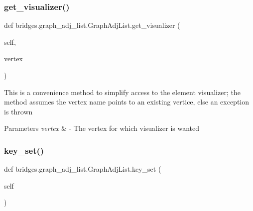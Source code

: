 \mbox{\label{classbridges_1_1graph__adj__list_1_1_graph_adj_list_ad63fce416ec0fdfd99d05e6236807fd8}} 
\subsubsection{\texorpdfstring{get\_visualizer()}{get\_visualizer()}}
{\footnotesize\ttfamily def bridges.\+graph\+\_\+adj\+\_\+list.\+Graph\+Adj\+List.\+get\+\_\+visualizer (\begin{DoxyParamCaption}\item[{}]{self,  }\item[{}]{vertex }\end{DoxyParamCaption})}

\begin{DoxyVerb}This is a convenience method to simplify access to the element visualizer;
the method assumes the vertex name points to an existing vertice, else an
exception is thrown
\end{DoxyVerb}



\begin{DoxyParams}{Parameters}
{\em vertex} & -\/ The vertex for which visualizer is wanted \\
\hline
\end{DoxyParams}
\mbox{\label{classbridges_1_1graph__adj__list_1_1_graph_adj_list_a96e264e71acad7474e233a1ec1d1035a}} 
\subsubsection{\texorpdfstring{key\_set()}{key\_set()}}
{\footnotesize\ttfamily def bridges.\+graph\+\_\+adj\+\_\+list.\+Graph\+Adj\+List.\+key\+\_\+set (\begin{DoxyParamCaption}\item[{}]{self }\end{DoxyParamCaption})}

